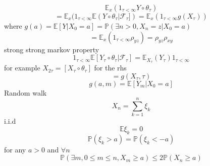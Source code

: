 \documentclass[11pt]{article}
\begin{document}
\[
    \mathbb{E}_x (1_{\tau < \infty} Y \circ \theta_\tau)
\] 
\[
    = \mathbb{E}_x(1_{\tau < \infty} \mathbb{E}(Y \circ \theta_\tau | \mathcal{F}_\tau]) = \mathbb{E}_x(1_{\tau < \infty} g(X_\tau))
\] 
where $g(a) = \mathbb{E}[Y | X_0 = a] = \mathbb{P}(\exists n > 0, X_n = z | X_0 = a)$ 
\[
    = \mathbb{E}_x(1_{\tau < \infty} \rho_{yz}) = \rho_{yz} \rho_{xy}
\] 
strong strong markov property
\[
    1_{\tau < \infty} \mathbb{E}[Y_{\tau} \circ \theta_{\tau} | \mathcal{F}_{\tau}] = \mathbb{E}_{X_\tau}(Y_\tau) 1_{\tau < \infty}
\] 
for example $X_{2\tau} = [X_{\tau} \circ \theta_\tau]$
for the rhs
\[
    = g(X_{\tau} , \tau)
\] 
\[
    g(a,m) = \mathbb{E}[Y_m | X_0 = a]
\] 
Random walk
\[
X_n = \sum_{k=1}^{n}\xi_k 
\] 
i.i.d
\[
\mathbb{E} \xi_k = 0
\] 
\[
\mathbb{P}(\xi_k > a) = \mathbb{P}(\xi_k < -a)
\] 
for any $a > 0$ and $ \forall n $
 \[
\mathbb{P}(\exists m , 0 \le m \le n, X_m \ge a) \le 2 \mathbb{P}(X_n \ge a)
\] 
\end{document}
